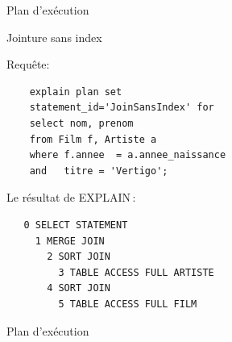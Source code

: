 \begin{frame}{Plan d'exécution}


\end{frame}

\begin{frame}[fragile]{Jointure sans index}

Requête: 
\begin{verbatim}
    explain plan set 
    statement_id='JoinSansIndex' for
    select nom, prenom
    from Film f, Artiste a
    where f.annee  = a.annee_naissance
    and   titre = 'Vertigo';
\end{verbatim}

\vfill

Le résultat de EXPLAIN\,:
\begin{verbatim}
   0 SELECT STATEMENT
     1 MERGE JOIN
       2 SORT JOIN
         3 TABLE ACCESS FULL ARTISTE
       4 SORT JOIN
         5 TABLE ACCESS FULL FILM
\end{verbatim}

\end{frame}

\begin{frame}{Plan d'exécution}


\end{frame}